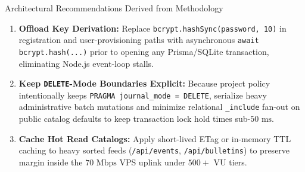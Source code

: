 \documentclass[11pt,letterpaper]{article}
\begin{document}
\begin{calloutbox}[NavyPrimary]{Architectural Recommendations Derived from Methodology}
\begin{enumerate}
  \item \textbf{Offload Key Derivation:} Replace \texttt{bcrypt.hashSync(password, 10)} in registration and user-provisioning paths with asynchronous \texttt{await bcrypt.hash(...)} prior to opening any Prisma/SQLite transaction, eliminating Node.js event-loop stalls.
  \item \textbf{Keep \texttt{DELETE}-Mode Boundaries Explicit:} Because project policy intentionally keeps \texttt{PRAGMA journal\_mode = DELETE}, serialize heavy administrative batch mutations and minimize relational \texttt{\_include} fan-out on public catalog defaults to keep transaction lock hold times sub-$50\text{ ms}$.
  \item \textbf{Cache Hot Read Catalogs:} Apply short-lived ETag or in-memory TTL caching to heavy sorted feeds (\texttt{/api/events}, \texttt{/api/bulletins}) to preserve margin inside the $70\text{ Mbps}$ VPS uplink under $500+$ VU tiers.
\end{enumerate}
\end{calloutbox}
\end{document}
